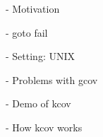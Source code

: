 
- Motivation

  - goto fail

- Setting: UNIX

- Problems with gcov

- Demo of kcov

- How kcov works
